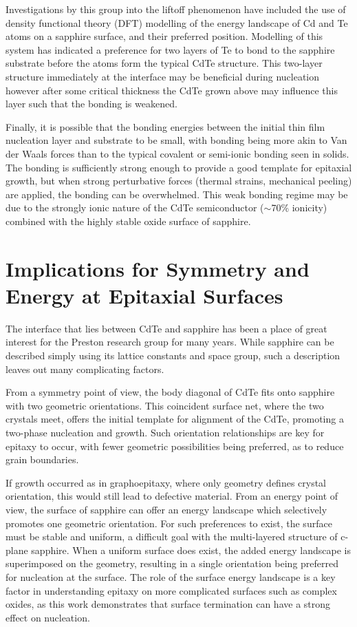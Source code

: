 Investigations by this group into the liftoff phenomenon have included the use of density functional theory (DFT) modelling of the energy landscape of Cd and Te atoms on a sapphire surface, and their preferred position.
Modelling of this system has indicated a preference for two layers of Te to bond to the sapphire substrate before the atoms form the typical CdTe structure.
This two-layer structure immediately at the interface may be beneficial during nucleation however after some critical thickness the CdTe grown above may influence this layer such that the bonding is weakened.

Finally, it is possible that the bonding energies between the initial thin film nucleation layer and substrate to be small, with bonding being more akin to Van der Waals forces than to the typical covalent or semi-ionic bonding seen in solids.
The bonding is sufficiently strong enough to provide a good template for epitaxial growth, but when strong perturbative forces (thermal strains, mechanical peeling) are applied, the bonding can be overwhelmed.
This weak bonding regime may be due to the strongly ionic nature of the CdTe semiconductor (\(\sim\)70\% ionicity) combined with the highly stable oxide surface of sapphire.
\section{Implications for Symmetry and Energy at Epitaxial Surfaces}
The interface that lies between CdTe and sapphire has been a place of great interest for the Preston research group for many years.
While sapphire can be described simply using its lattice constants and space group, such a description leaves out many complicating factors.

From a symmetry point of view, the body diagonal of CdTe fits onto sapphire with two geometric orientations.
This coincident surface net, where the two crystals meet, offers the initial template for alignment of the CdTe, promoting a two-phase nucleation and growth.
Such orientation relationships are key for epitaxy to occur, with fewer geometric possibilities being preferred, as to reduce grain boundaries.

If growth occurred as in graphoepitaxy, where only geometry defines crystal orientation, this would still lead to defective material.
From an energy point of view, the surface of sapphire can offer an energy landscape which selectively promotes one geometric orientation.
For such preferences to exist, the surface must be stable and uniform, a difficult goal with the multi-layered structure of c-plane sapphire.
When a uniform surface does exist, the added energy landscape is superimposed on the geometry, resulting in a single orientation being preferred for nucleation at the surface.
The role of the surface energy landscape is a key factor in understanding epitaxy on more complicated surfaces such as complex oxides, as this work demonstrates that surface termination can have a strong effect on nucleation.
